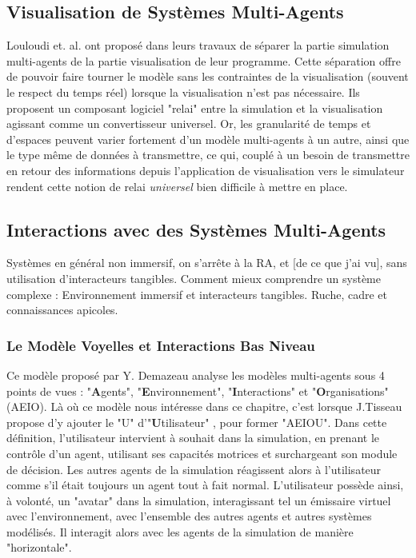 		
		\subsection{Visualisation de Systèmes Multi-Agents}
		
		Louloudi et. al. \cite{louloudi_new_2012} ont proposé dans leurs travaux de séparer la partie simulation multi-agents de la partie visualisation de leur programme. Cette séparation offre de pouvoir faire tourner le modèle sans les contraintes de la visualisation (souvent le respect du temps réel) lorsque la visualisation n'est pas nécessaire. Ils proposent un composant logiciel "relai" entre la simulation et la visualisation agissant comme un convertisseur universel. Or, les granularité de temps et d'espaces peuvent varier fortement d'un modèle multi-agents à un autre, ainsi que le type même de données à transmettre, ce qui, couplé à un besoin de transmettre en retour des informations depuis l'application de visualisation vers le simulateur rendent cette notion de relai \textit{universel} bien difficile à mettre en place.
		
		
		\subsection{Interactions avec des Systèmes Multi-Agents}
		Systèmes en général non immersif, on s'arrête à la RA, et [de ce que j'ai vu], sans utilisation d'interacteurs tangibles.
	Comment mieux comprendre un système complexe : Environnement immersif et interacteurs tangibles. Ruche, cadre et connaissances apicoles.
	
	\subsubsection{Le Modèle Voyelles et Interactions Bas Niveau}
		Ce modèle proposé par Y. Demazeau \cite{demazeau_interactions_1995} analyse les modèles multi-agents sous 4 points de vues : "\textbf{A}gents", "\textbf{E}nvironnement", "\textbf{I}nteractions" et "\textbf{O}rganisations" (AEIO). Là où ce modèle nous intéresse dans ce chapitre, c'est lorsque J.Tisseau propose d'y ajouter le "U" d'"\textbf{U}tilisateur" \cite{tisseau_realite_2001}, pour former "AEIOU". Dans cette définition, l'utilisateur intervient à souhait dans la simulation, en prenant le contrôle d'un agent, utilisant ses capacités motrices et surchargeant son module de décision. Les autres agents de la simulation réagissent alors à l'utilisateur comme s'il était toujours un agent tout à fait normal. 
		L'utilisateur possède ainsi, à volonté, un "avatar" dans la simulation, interagissant tel un émissaire virtuel avec l'environnement, avec l'ensemble des autres agents et autres systèmes modélisés. Il interagit alors avec les agents de la simulation de manière "horizontale".
		
